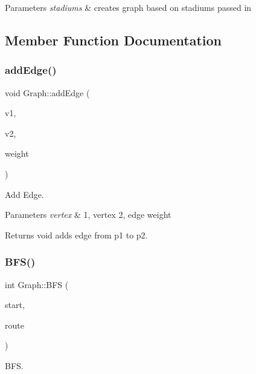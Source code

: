 \begin{DoxyParams}{Parameters}
{\em stadiums} & creates graph based on stadiums passed in \\
\hline
\end{DoxyParams}


\subsection{Member Function Documentation}
\mbox{\label{class_graph_aba11741e1190c29cea65db0c88cb8e9a}} 
\subsubsection{\texorpdfstring{add\+Edge()}{addEdge()}}
{\footnotesize\ttfamily void Graph\+::add\+Edge (\begin{DoxyParamCaption}\item[{int}]{v1,  }\item[{int}]{v2,  }\item[{int}]{weight }\end{DoxyParamCaption})}



Add Edge. 


\begin{DoxyParams}{Parameters}
{\em vertex} & 1, vertex 2, edge weight \\
\hline
\end{DoxyParams}
\begin{DoxyReturn}{Returns}
void  adds edge from p1 to p2. 
\end{DoxyReturn}
\mbox{\label{class_graph_a97dda4b96f3b3b07cfcb95461fc6bd9b}} 
\subsubsection{\texorpdfstring{B\+F\+S()}{BFS()}}
{\footnotesize\ttfamily int Graph\+::\+B\+FS (\begin{DoxyParamCaption}\item[{Q\+String}]{start,  }\item[{std\+::vector$<$ Q\+String $>$ $\ast$}]{route }\end{DoxyParamCaption})}



B\+FS. 


